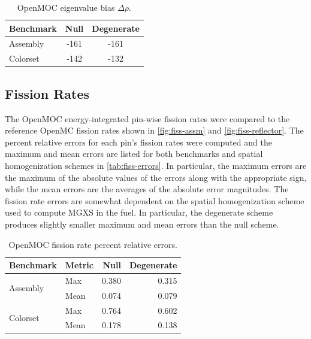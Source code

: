 \begin{table}[h!]
  \centering
  \caption{OpenMOC eigenvalue bias $\Delta\rho$.}
  \label{tab:keff-bias} 
  \begin{tabular}{l c c}
  \toprule
  \textbf{Benchmark} & \textbf{Null} & \textbf{Degenerate} \\
  \midrule
  Assembly & -161 & -161 \\
  Colorset & -142 & -132 \\
  \bottomrule
\end{tabular}
\end{table}


\subsection{Fission Rates}
\label{subsec:fiss-rates}

The OpenMOC energy-integrated pin-wise fission rates were compared to the reference OpenMC fission rates shown in \autoref{fig:fiss-assm} and \autoref{fig:fiss-reflector}. The percent relative errors for each pin's fission rates were computed and the maximum and mean errors are listed for both benchmarks and spatial homogenization schemes in \autoref{tab:fiss-errors}. In particular, the maximum errors are the maximum of the absolute values of the errors along with the appropriate sign, while the mean errors are the averages of the absolute error magnitudes. The fission rate errors are somewhat dependent on the spatial homogenization scheme used to compute MGXS in the fuel. In particular, the degenerate scheme produces slightly smaller maximum and mean errors than the null scheme.

\begin{table}[h!]
  \centering
  \caption{OpenMOC fission rate percent relative errors.}
  \label{tab:fiss-errors}
  \begin{tabular}{l l r r}
  \toprule
  \textbf{Benchmark} & \textbf{Metric} & \textbf{Null} & \textbf{Degenerate} \\
  \midrule
  \multirow{2}{*}{Assembly} & Max  & 0.380 & 0.315 \\
                            & Mean & 0.074 & 0.079 \\
  \midrule
  \multirow{2}{*}{Colorset} & Max  & 0.764 & 0.602 \\
                            & Mean & 0.178 & 0.138 \\
  \bottomrule
\end{tabular}
\end{table}


